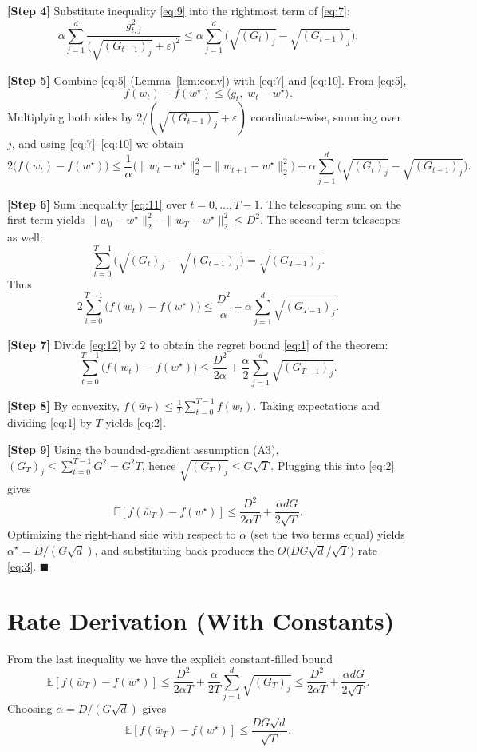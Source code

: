 \documentclass{article}
\begin{document}
\noindent\textbf{[Step 4]}  Substitute inequality \eqref{eq:9} into the
rightmost term of \eqref{eq:7}:
\[
\alpha\sum_{j=1}^{d}\frac{g_{t,j}^2}{\bigl(\sqrt{(G_{t-1})_j}+\varepsilon\bigr)^2}
\le
\alpha\sum_{j=1}^{d}\bigl(\sqrt{(G_{t})_j}-\sqrt{(G_{t-1})_j}\bigr).
\tag{10}
\]

\noindent\textbf{[Step 5]}  Combine \eqref{eq:5} (Lemma~\ref{lem:conv})
with \eqref{eq:7} and \eqref{eq:10}.
From \eqref{eq:5},
\[
f(w_t)-f(w^\star)\le\langle g_t,\;w_t-w^\star\rangle .
\]
Multiplying both sides by $2/(\sqrt{(G_{t-1})_j}+\varepsilon)$ coordinate‑wise,
summing over $j$, and using \eqref{eq:7}–\eqref{eq:10} we obtain
\[
2\bigl(f(w_t)-f(w^\star)\bigr)
\le
\frac{1}{\alpha}\bigl(\|w_{t}-w^\star\|_2^2-\|w_{t+1}-w^\star\|_2^2\bigr)
+\alpha\sum_{j=1}^{d}\bigl(\sqrt{(G_{t})_j}-\sqrt{(G_{t-1})_j}\bigr).
\tag{11}
\]

\noindent\textbf{[Step 6]}  Sum inequality \eqref{eq:11} over $t=0,\dots,T-1$.
The telescoping sum on the first term yields $\|w_0-w^\star\|_2^2-\|w_T-w^\star\|_2^2\le D^2$.
The second term telescopes as well:
\[
\sum_{t=0}^{T-1}\bigl(\sqrt{(G_{t})_j}-\sqrt{(G_{t-1})_j}\bigr)
= \sqrt{(G_{T-1})_j}.
\]
Thus
\[
2\sum_{t=0}^{T-1}\bigl(f(w_t)-f(w^\star)\bigr)
\le
\frac{D^2}{\alpha}
+\alpha\sum_{j=1}^{d}\sqrt{(G_{T-1})_j}.
\tag{12}
\]

\noindent\textbf{[Step 7]}  Divide \eqref{eq:12} by $2$ to obtain the
regret bound \eqref{eq:1} of the theorem:
\[
\sum_{t=0}^{T-1}\bigl(f(w_t)-f(w^\star)\bigr)
\le
\frac{D^2}{2\alpha}
+\frac{\alpha}{2}\sum_{j=1}^{d}\sqrt{(G_{T-1})_j}.
\]

\noindent\textbf{[Step 8]}  By convexity,
$f(\bar w_T)\le\frac1T\sum_{t=0}^{T-1}f(w_t)$.  Taking expectations and
dividing \eqref{eq:1} by $T$ yields \eqref{eq:2}.

\noindent\textbf{[Step 9]}  Using the bounded‑gradient assumption (A3),
$(G_T)_j\le\sum_{t=0}^{T-1}G^2 = G^2 T$, hence
$\sqrt{(G_T)_j}\le G\sqrt{T}$.  Plugging this into \eqref{eq:2} gives
\[
\mathbb{E}[f(\bar w_T)-f(w^\star)]
\le
\frac{D^2}{2\alpha T}
+\frac{\alpha d G}{2\sqrt{T}}.
\]
Optimizing the right‑hand side with respect to $\alpha$ (set the two
terms equal) yields $\alpha^\star = D/(G\sqrt{d})$, and substituting back
produces the $O\!\bigl(DG\sqrt{d}/\sqrt{T}\bigr)$ rate \eqref{eq:3}.
\hfill $\blacksquare$

\section*{Rate Derivation (With Constants)}
From the last inequality we have the explicit constant‑filled bound
\[
\boxed{
\mathbb{E}[f(\bar w_T)-f(w^\star)]
\le
\frac{D^2}{2\alpha T}
+\frac{\alpha}{2T}\sum_{j=1}^{d}\sqrt{(G_T)_j}
\le
\frac{D^2}{2\alpha T}
+\frac{\alpha d G}{2\sqrt{T}} }.
\]
Choosing $\alpha = D/(G\sqrt{d})$ gives
\[
\mathbb{E}[f(\bar w_T)-f(w^\star)]
\le
\frac{DG\sqrt{d}}{\sqrt{T}} .
\]
\end{document}
